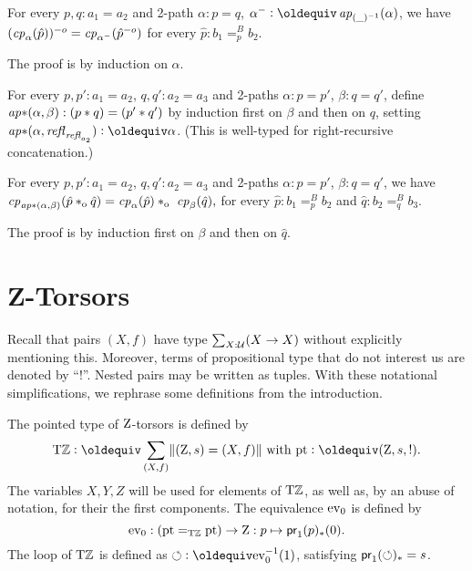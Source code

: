 \documentclass[a4,12pt]{amsart}
\begin{document}
\begin{lemma}\label{lem:inv-change-path}
  For every  $p,q:a_1=a_2$ and 2-path $\alpha : p = q$,
  $\alpha^- \defeq \ap{(\_)^{-1}}(\alpha)$, we have
  $(\mathit{cp}_{\alpha}(\hat p))^{-o} = \mathit{cp}_{\alpha^-}(\hat p^{-o})$
  for every $\hat p: b_1=^B_p b_2$.
\end{lemma}
 The proof is by induction on $\alpha$.

\begin{definition}\label{lem:concat-ap-ap}
  For every  $p,p':a_1=a_2$, $q,q':a_2=a_3$ and 2-paths 
  $\alpha : p = p'$, $\beta : q = q'$, define
  $\mathop{{\it ap}{*}}(\alpha,\beta): (p* q)=(p'* q')$ by induction
  first on $\beta$ and then on $q$, 
  setting $\apc(\alpha,\refl{\refl{a_2}}) \defeq \alpha$.
  (This is well-typed for right-recursive concatenation.)
\end{definition}

\begin{lemma}\label{lem:concat-change-path}
  For every  $p,p':a_1=a_2$, $q,q':a_2=a_3$ and 2-paths 
  $\alpha : p = p'$, $\beta : q = q'$, we have
  $\cp{\apc(\alpha,\beta)}(\hat p \cto \hat q) = 
   \cp{\alpha}(\hat p) \cto  \cp{\beta}(\hat q),$
  for every $\hat p: b_1=^B_p b_2$ and $\hat q: b_2=^B_q b_3$.
\end{lemma}
 The proof is by induction first on $\beta$ and then on $\hat q$.




\section{Z-Torsors}\label{sec:ZTorsors}

Recall that pairs $(X,f)$ have type $\sum_{X:\mathcal{U}}(X\to X)$
without explicitly mentioning this. Moreover, terms of
propositional type that do not interest us are denoted by ``$!$''.
Nested pairs may be written as tuples.
With these notational simplifications, we rephrase
some definitions from the introduction.

\begin{definition}\label{sec:ZTors}
The pointed type of $\mathrm{Z}$-torsors is defined by
\[
\TorZ\defeq \sum_{(X,f)}\Trunc{(\zet,s)=(X,f)} \text{~with~} \pt\defeq (\zet,s,!).
\]
The variables $X,Y,Z$ will be used for elements of ${\mathrm{T}\mathbb{Z}}$, 
as well as, by an abuse of notation, for their the first components.
The equivalence $\mathrm{ev}_0$ is defined by
\[
\mathrm{ev}_0: ({\mathord{\mathrm{pt}}} =_{\mathrm{T}\mathbb{Z}} {\mathord{\mathrm{pt}}})\to\mathrm{Z}: p \mapsto \mathsf{pr}_1(p)_*(0).
\]
The loop of ${\mathrm{T}\mathbb{Z}}$ is defined as ${\Zloop}\defeq\ev_0^{-1}(1)$,
satisfying $\mathsf{pr}_1(\circlearrowleft)_* = s$.
\end{definition}
\end{document}
